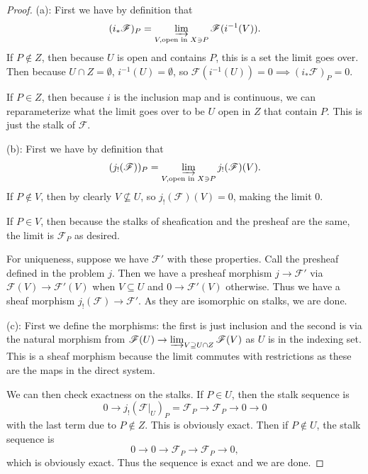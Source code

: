 \begin{proof}
	(a): First we have by definition that
	\[
		(i_\ast \mathscr{F})_P = \varinjlim_{V, \text{open in $X $} \ni P} \mathscr{F}(i^{-1}(V))
	.\]
	If $P\notin Z $, then because $U $ is open and contains $P $, this is a set the limit goes over.
	Then because $U\cap Z = \emptyset $, $i^{-1}(U) = \emptyset $, so $\mathscr{F}(i^{-1}(U)) = 0 \implies (i_\ast \mathscr{F})_P = 0 $.

	If $P\in Z $, then because $i $ is the inclusion map and is continuous, we can reparameterize what the limit goes over to be $U $ open in $Z $ that contain $P $.
	This is just the stalk of $\mathscr{F} $.

	(b): First we have by definition that
	\[
		(j_! (\mathscr{F}))_P = \varinjlim_{V, \text{open in $X $} \ni P} j_!(\mathscr{F})(V)
	.\]
	If $P \notin V $, then by clearly $V\not\subseteq U $, so $j_!(\mathscr{F})(V) = 0 $, making the limit $0 $.

	If $P\in V $, then because the stalks of sheafication and the presheaf are the same, the limit is $\mathscr{F}_P $ as desired.

	For uniqueness, suppose we have $\mathscr{F}' $ with these properties.
	Call the presheaf defined in the problem $j $.
	Then we have a presheaf morphism $j\to \mathscr{F}' $ via $\mathscr{F}(V) \to \mathscr{F}'(V) $ when $V \subseteq U $ and $0\to \mathscr{F}'(V) $ otherwise.
	Thus we have a sheaf morphism $j_! (\mathscr{F}) \to \mathscr{F}' $.
	As they are isomorphic on stalks, we are done.

	(c): First we define the morphisms: the first is just inclusion and the second is via the natural morphism from $\mathscr{F}(U) \to \varinjlim_{V \supseteq U\cap Z} \mathscr{F}(V) $ as $U $ is in the indexing set.
	This is a sheaf morphism because the limit commutes with restrictions as these are the maps in the direct system.

	We can then check exactness on the stalks.
	If $P \in U $, then the stalk sequence is
	\[
		0 \to j_!(\mathscr{F}|_U)_P = \mathscr{F}_P \to \mathscr{F}_P \to 0 \to 0
	\]
	with the last term due to $P\notin Z $.
	This is obviously exact.
	Then if $P\notin U $, the stalk sequence is
	\[
		0\to 0\to \mathscr{F}_P \to \mathscr{F}_P \to 0,
	\]
	which is obviously exact.
	Thus the sequence is exact and we are done.
\end{proof}

